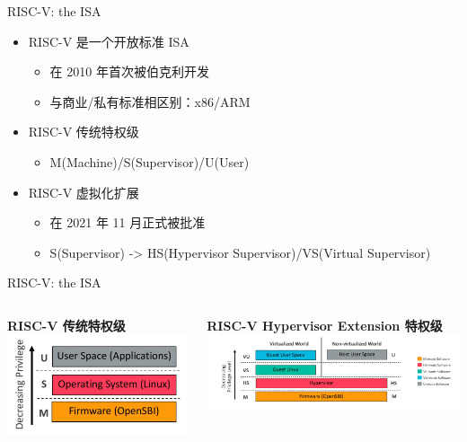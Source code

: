 \documentclass{beamer}
\begin{document}
  \begin{frame}{RISC-V: the ISA}
    \begin{itemize}
        \item RISC-V 是一个开放标准 ISA
        \begin{itemize}
            \item 在 2010 年首次被伯克利开发
            \item 与商业/私有标准相区别：x86/ARM
        \end{itemize}
        \item RISC-V 传统特权级
        \begin{itemize}
            \item M(Machine)/S(Supervisor)/U(User)
        \end{itemize}
        \item RISC-V 虚拟化扩展
        \begin{itemize}
            \item 在 2021 年 11 月正式被批准
            \item S(Supervisor) -> HS(Hypervisor Supervisor)/VS(Virtual Supervisor)
        \end{itemize}
    \end{itemize}
  \end{frame}

    \begin{frame}{RISC-V: the ISA}
        \begin{columns}
            \begin{column}{0.4\textwidth}
                \centering
                \textbf{RISC-V 传统特权级}
                \includegraphics[width=\linewidth]{pic/tradition-priv.png}   
            \end{column}
            \begin{column}{0.6\textwidth}
                \centering
                \textbf{RISC-V Hypervisor Extension 特权级}
                \includegraphics[width=\linewidth]{pic/h-priv.png}   
            \end{column}
        \end{columns}
    \end{frame}
\end{document}
